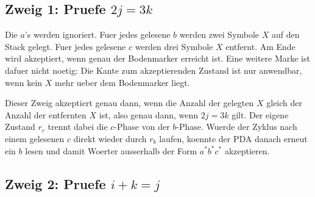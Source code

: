 \documentclass[a4paper,12pt,fleqn]{article}
\begin{document}
\subsection*{Zweig 1: Pruefe $2j=3k$}

Die $a$'s werden ignoriert. Fuer jedes gelesene $b$ werden zwei Symbole $X$ auf den Stack gelegt. Fuer
jedes gelesene $c$ werden drei Symbole $X$ entfernt. Am Ende wird akzeptiert, wenn genau der
Bodenmarker erreicht ist. Eine weitere Marke ist dafuer nicht noetig: Die Kante zum akzeptierenden
Zustand ist nur anwendbar, wenn kein $X$ mehr ueber dem Bodenmarker liegt.

\begin{center}
\end{center}

Dieser Zweig akzeptiert genau dann, wenn die Anzahl der gelegten $X$ gleich der Anzahl der entfernten
$X$ ist, also genau dann, wenn $2j=3k$ gilt. Der eigene Zustand $r_c$ trennt dabei die $c$-Phase von
der $b$-Phase. Wuerde der Zyklus nach einem gelesenen $c$ direkt wieder durch $r_b$ laufen, koennte der
PDA danach erneut ein $b$ lesen und damit Woerter ausserhalb der Form $a^*b^*c^*$ akzeptieren.

\subsection*{Zweig 2: Pruefe $i+k=j$}
\end{document}
